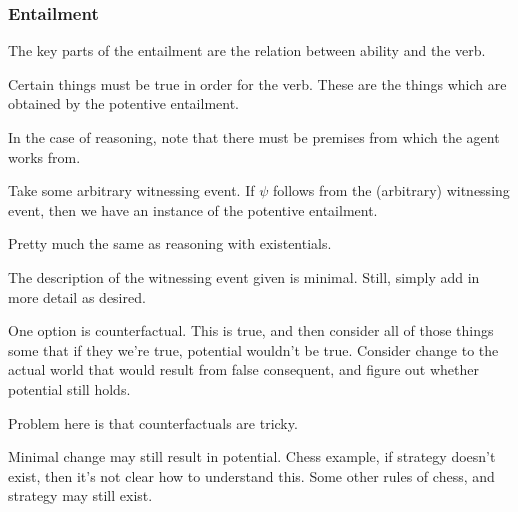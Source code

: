 \subsubsection{Entailment}
\label{sec:entailment-1}

\begin{note}
  The key parts of the entailment are the relation between ability and the verb.

  Certain things must be true in order for the verb.
  These are the things which are obtained by the potentive entailment.

  In the case of reasoning, note that there must be premises from which the agent works from.
\end{note}

\begin{note}
  Take some arbitrary witnessing event.
  If \(\psi\) follows from the (arbitrary) witnessing event, then we have an instance of the potentive entailment.

  Pretty much the same as reasoning with existentials.
\end{note}

\begin{note}
  The description of the witnessing event given is minimal.
  Still, simply add in more detail as desired.
\end{note}


\begin{note}[Counterfactual]
  One option is counterfactual.
  This is true, and then consider all of those things some that if they we're true, potential wouldn't be true.
  Consider change to the actual world that would result from false consequent, and figure out whether potential still holds.

  Problem here is that counterfactuals are tricky.

  Minimal change may still result in potential.
  Chess example, if strategy doesn't exist, then it's not clear how to understand this.
  Some other rules of chess, and strategy may still exist.
\end{note}

